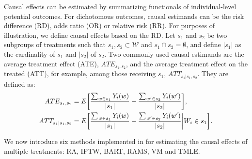Causal effects can be estimated by summarizing functionals of individual-level potential outcomes. For dichotomous outcomes, causal estimands can be the risk difference (RD), odds ratio (OR) or relative risk (RR).  For purposes of illustration, we define causal effects based on the RD.  Let $s_1$ and $s_2$ be two subgroups of treatments such that $s_1,s_2 \subset \mathscr{W}$ and $s_1 \cap s_2 = \emptyset$,  and define $|s_1|$ as the cardinality of $s_1$ and $|s_2|$ of $s_2$.  Two commonly used causal estimands are the average treatment effect (ATE), $ATE_{s_1,s_2}$, and the average treatment effect on the treated (ATT), for example, among those receiving $s_1$, $ATT_{s_1|s_1,s_2}$. They are defined as: 
\begin{equation}
\begin{split}
\label{eq:pop_est}
ATE_{s_1,s_2} &= E \bigg{[} \frac{\sum_{w \in s_1} Y_i(w)}{|s_1|} - \frac{\sum_{w' \in s_2} Y_i(w')}{|s_2|} \bigg{]},\\
ATT_{s_1|s_1,s_2} &= E \bigg{[} \frac{\sum_{w \in s_1} Y_i(w)}{|s_1|} - \frac{\sum_{w' \in s_2} Y_i(w')}{|s_2|} \bigg{|} W_i \in s_1 \bigg{]}.
\end{split}
\end{equation}


We now introduce six methods implemented in  for estimating the causal effects of multiple treatments: RA, IPTW, BART, RAMS, VM and TMLE.  

